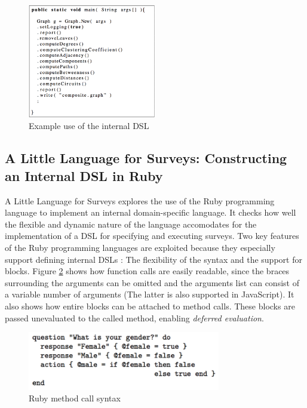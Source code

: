 \begin{figure}[!ht]
  	\centering
    	\includegraphics[width=0.5\textwidth]{images/MethodChainingJava} 
    	\caption{Example use of the internal DSL}
    \label{fig:MethodChainingJava}
\end{figure}

\subsection{A Little Language for Surveys: Constructing an Internal DSL in Ruby}
A Little Language for Surveys \cite{RubyDSL} explores the use of the Ruby programming language to implement an internal domain-specific language. It checks how well the flexible and dynamic nature of the language accomodates for the implementation of a DSL for specifying and executing surveys. Two key features of the Ruby programming languages are exploited because they especially support defining internal DSLs : The flexibility of the syntax\cite{RubyFlexibleSupport} and the support for blocks\cite{RubyBlockSupport}. Figure \ref{fig:RubySyntax} shows how function calls are easily readable, since the braces surrounding the arguments can be omitted and the arguments list can consist of a variable number of arguments (The latter is also supported in JavaScript\cite{Ecma6}). It also shows how entire blocks can be attached to method calls. These blocks are passed unevaluated to the called method, enabling \textit{deferred evaluation}.

\begin{figure}[!ht]
  	\centering
    	\includegraphics[width=0.75\textwidth]{images/RubySyntax} 
    	\caption{Ruby method call syntax}
    \label{fig:RubySyntax}
\end{figure}


